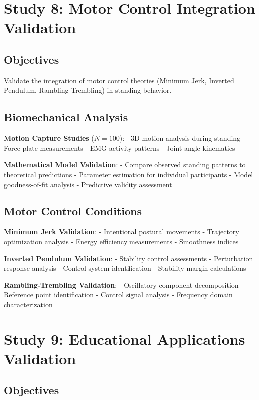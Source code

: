 \documentclass[12pt]{article}
\begin{document}
\section{Study 8: Motor Control Integration Validation}

\subsection{Objectives}

Validate the integration of motor control theories (Minimum Jerk, Inverted Pendulum, Rambling-Trembling) in standing behavior.

\subsection{Biomechanical Analysis}

\textbf{Motion Capture Studies} ($N = 100$):
- 3D motion analysis during standing
- Force plate measurements
- EMG activity patterns
- Joint angle kinematics

\textbf{Mathematical Model Validation}:
- Compare observed standing patterns to theoretical predictions
- Parameter estimation for individual participants
- Model goodness-of-fit analysis
- Predictive validity assessment

\subsection{Motor Control Conditions}

\textbf{Minimum Jerk Validation}:
- Intentional postural movements
- Trajectory optimization analysis
- Energy efficiency measurements
- Smoothness indices

\textbf{Inverted Pendulum Validation}:
- Stability control assessments
- Perturbation response analysis
- Control system identification
- Stability margin calculations

\textbf{Rambling-Trembling Validation}:
- Oscillatory component decomposition
- Reference point identification
- Control signal analysis
- Frequency domain characterization

\section{Study 9: Educational Applications Validation}

\subsection{Objectives}
\end{document}
